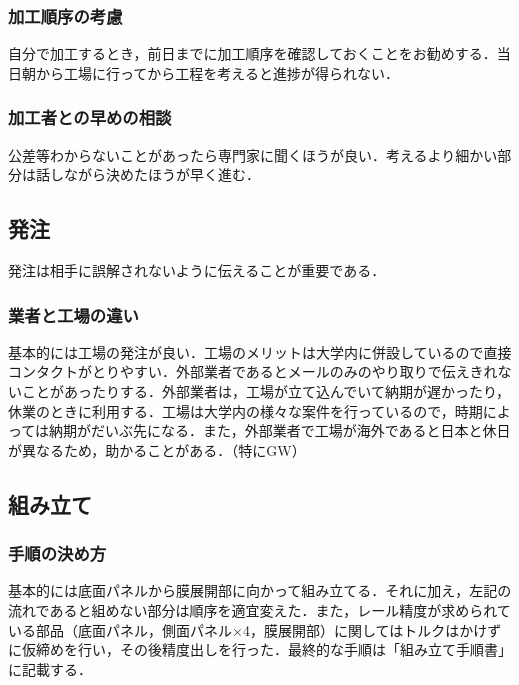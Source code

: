 \subsubsection{加工順序の考慮}
自分で加工するとき，前日までに加工順序を確認しておくことをお勧めする．当日朝から工場に行ってから工程を考えると進捗が得られない．
\subsubsection{加工者との早めの相談}
公差等わからないことがあったら専門家に聞くほうが良い．考えるより細かい部分は話しながら決めたほうが早く進む．


\subsection{発注}
発注は相手に誤解されないように伝えることが重要である．
\subsubsection{業者と工場の違い}
基本的には工場の発注が良い．工場のメリットは大学内に併設しているので直接コンタクトがとりやすい．外部業者であるとメールのみのやり取りで伝えきれないことがあったりする．外部業者は，工場が立て込んでいて納期が遅かったり，休業のときに利用する．工場は大学内の様々な案件を行っているので，時期によっては納期がだいぶ先になる．また，外部業者で工場が海外であると日本と休日が異なるため，助かることがある．（特にGW）


\subsection{組み立て}

\subsubsection{手順の決め方}
基本的には底面パネルから膜展開部に向かって組み立てる．それに加え，左記の流れであると組めない部分は順序を適宜変えた．また，レール精度が求められている部品（底面パネル，側面パネル×4，膜展開部）に関してはトルクはかけずに仮締めを行い，その後精度出しを行った．最終的な手順は「組み立て手順書」に記載する．
